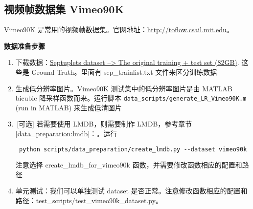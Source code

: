 \documentclass[../main.tex]{subfiles}
\begin{document}
\subsection{视频帧数据集 Vimeo90K}

Vimeo90K 是常用的视频帧数据集。官网地址：\url{http://toflow.csail.mit.edu}。

\noindent\textbf{数据准备步骤}
\begin{enumerate}
    \item 下载数据：\href{http://data.csail.mit.edu/tofu/dataset/vimeo_septuplet.zip}{Septuplets dataset --> The original training + test set (82GB)}. 这些是 Ground-Truth。里面有 sep\_trainlist.txt 文件来区分训练数据
    \item 生成低分辨率图片。Vimeo90K 测试集中的低分辨率图片是由 MATLAB bicubic 降采样函数而来。运行脚本 \texttt{data\_scripts/generate\_LR\_Vimeo90K.m} (run in MATLAB) 来生成低清图片
    \item\,[可选] 若需要使用 LMDB，则需要制作 LMDB，参考章节\ref{data_preparation:lmdb}：。运行
    \begin{verbatim}
 python scripts/data_preparation/create_lmdb.py --dataset vimeo90k
\end{verbatim}
    注意选择 create\_lmdb\_for\_vimeo90k 函数，并需要修改函数相应的配置和路径
    \item 单元测试：我们可以单独测试 dataset 是否正常。注意修改函数相应的配置和路径：test\_scripts/test\_vimeo90k\_dataset.py。 
\end{enumerate}
\end{document}
